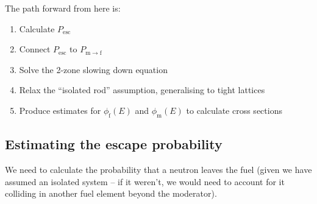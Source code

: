 The path forward from here is:
\begin{enumerate}
    \item Calculate $P_\mathrm{esc}$
    \item Connect $P_\mathrm{esc}$ to $P_{\mathrm{m}\rightarrow\mathrm{f}}$
    \item Solve the 2-zone slowing down equation
    \item Relax the ``isolated rod'' assumption, generalising to tight lattices
    \item Produce estimates for $\phi_\mathrm{f}(E)$ and $\phi_\mathrm{m}(E)$ to calculate cross sections
\end{enumerate}

\subsection{Estimating the escape probability}

We need to calculate the probability that a neutron leaves the fuel (given we have assumed an isolated system -- if it weren't, we would need to account for it colliding in another fuel element beyond the moderator).

